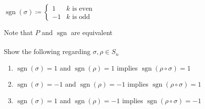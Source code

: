 \documentclass{article}
\begin{document}
\begin{enumerate}
\begin{center}
        $\operatorname{sgn}(\sigma) \coloneq\begin{cases} 
      1 & k\text{ is even} \\
      -1 & k\text{ is odd}
    \end{cases}$
    \end{center}
    Note that $P$ and $\operatorname{sgn}$ are equivalent
    \text{}\\\\Show the following regarding $\sigma, \rho\in S_n$
    \begin{enumerate}
        \item $\operatorname{sgn}(\sigma) = 1$ and $\operatorname{sgn}(\rho) = 1$ implies $\operatorname{sgn}(\rho\circ\sigma) = 1$
        \item $\operatorname{sgn}(\sigma) = -1$ and $\operatorname{sgn}(\rho) = -1$ implies $\operatorname{sgn}(\rho\circ\sigma) = 1$
        \item $\operatorname{sgn}(\sigma) = 1$ and $\operatorname{sgn}(\rho) = -1$ implies $\operatorname{sgn}(\rho\circ\sigma) = -1$
    \end{enumerate}
\end{enumerate}
\end{document}
